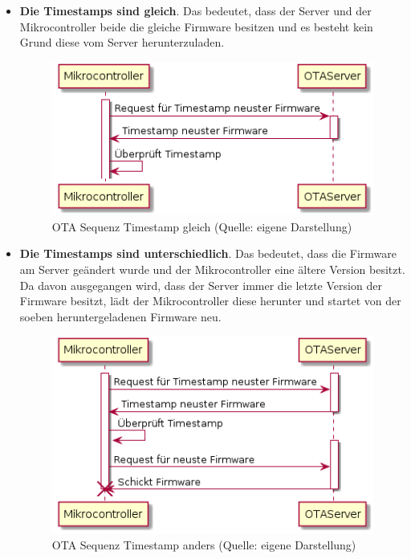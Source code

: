 \begin{itemize}
    \item \textbf{Die Timestamps sind gleich}. Das bedeutet, dass der Server und der Mikrocontroller beide die gleiche Firmware besitzen und es besteht kein Grund diese vom Server herunterzuladen.
    \begin{figure}[H]
        \begin{center}
            \includegraphics[scale=0.8]{diagrams/ota_sequence_same_timestamp.png}
            \caption{OTA Sequenz Timestamp gleich (Quelle: eigene Darstellung)}
        \end{center}
    \end{figure}
    \newpage
    \item \textbf{Die Timestamps sind unterschiedlich}. Das bedeutet, dass die Firmware am Server geändert wurde und der Mikrocontroller eine ältere Version besitzt.\newline
    Da davon ausgegangen wird, dass der Server immer die letzte Version der Firmware besitzt, lädt der Mikrocontroller diese herunter und startet von der soeben heruntergeladenen Firmware neu.
    \begin{figure}[H]
        \begin{center}
            \includegraphics[scale=0.8]{diagrams/ota_sequence_different_timestamp.png}
            \caption{OTA Sequenz Timestamp anders (Quelle: eigene Darstellung)}
        \end{center}
    \end{figure}
\end{itemize}

